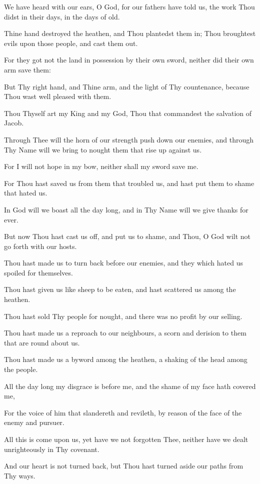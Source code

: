 We have heard with our ears, O God, for our fathers have told us, the work Thou didst in their days, in the days of old.

Thine hand destroyed the heathen, and Thou plantedst them in; Thou broughtest evils upon those people, and cast them out.

For they got not the land in possession by their own sword, neither did their own arm save them:

But Thy right hand, and Thine arm, and the light of Thy countenance, because Thou wast well pleased with them.

Thou Thyself art my King and my God, Thou that commandest the salvation of Jacob.

Through Thee will the horn of our strength push down our enemies, and through Thy Name will we bring to nought them that rise up against us.

For I will not hope in my bow, neither shall my sword save me.

For Thou hast saved us from them that troubled us, and hast put them to shame that hated us.

In God will we boast all the day long, and in Thy Name will we give thanks for ever.

But now Thou hast cast us off, and put us to shame, and Thou, O God wilt not go forth with our hosts.

Thou hast made us to turn back before our enemies, and they which hated us spoiled for themselves.

Thou hast given us like sheep to be eaten, and hast scattered us among the heathen.

Thou hast sold Thy people for nought, and there was no profit by our selling.

Thou hast made us a reproach to our neighbours, a scorn and derision to them that are round about us.

Thou hast made us a byword among the heathen, a shaking of the head among the people.

All the day long my disgrace is before me, and the shame of my face hath covered me,

For the voice of him that slandereth and revileth, by reason of the face of the enemy and pursuer.

All this is come upon us, yet have we not forgotten Thee, neither have we dealt unrighteously in Thy covenant.

And our heart is not turned back, but Thou hast turned aside our paths from Thy ways.

